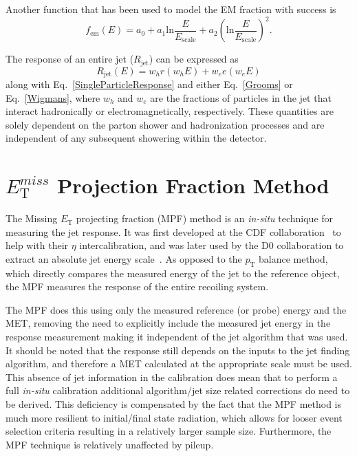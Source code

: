 \noindent 
Another function that has been used to model the EM fraction with success is 
\begin{equation}
  \label{Wigmans}
  f_{\mathrm{em}}\left(E\right)=a_0+a_1\mathrm{ln}\frac{E}{E_{\mathrm{scale}}}+a_2\left(\mathrm{ln}\frac{E}{E_{\mathrm{scale}}}\right)^2.
\end{equation}

The response of an entire jet ($R_{\mathrm{jet}}$) can be expressed as 
\begin{equation}
  R_{\mathrm{jet}}\left(E\right)=w_hr\left(w_hE\right)+w_ee\left(w_eE\right)
\end{equation}
along with Eq.~\ref{SingleParticleResponse} and either Eq.~\ref{Grooms} or Eq.~\ref{Wigmans}, where $w_h$ and  $w_e$ are the fractions of particles in the jet that interact hadronically or electromagnetically, respectively.  
These quantities are solely dependent on the parton shower and hadronization processes and are independent of any subsequent showering within the detector.   

\section{$E_{\mathrm T}^{miss}$ Projection Fraction Method}
\label{METProj}

The Missing $E_{\mathrm T}$ projecting fraction (MPF) method is an \textit{in-situ} technique for measuring the jet response.  
It was first developed at the CDF collaboration~\cite{abe1992dijet} to help with their $\eta$ intercalibration, and was later used by the D0 collaboration to extract an absolute jet energy scale~\cite{item/10150/186444}.  
As opposed to the $p_{\mathrm T}$ balance method, which directly compares the measured energy of the jet to the reference object, the MPF measures the response of the entire recoiling system.

The MPF does this using only the measured reference (or probe) energy and the MET, removing the need to explicitly include the measured jet energy in the response measurement making it independent of the jet algorithm that was used.  
It should be noted that the response still depends on the inputs to the jet finding algorithm, and therefore a MET calculated at the appropriate scale must be used.  
This absence of jet information in the calibration does mean that to perform a full \textit{in-situ} calibration additional algorithm/jet size related corrections do need to be derived.  
This deficiency is compensated by the fact that the MPF method is much more resilient to initial/final state radiation, which allows for looser event selection criteria resulting in a relatively larger sample size.  
Furthermore, the MPF technique is relatively unaffected by pileup.  

